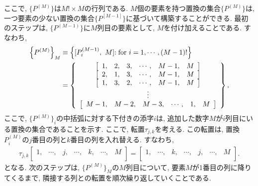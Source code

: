 ここで, $\{P^{(M)}\}$は$M! \times M$の行列である. 
$M$個の要素を持つ置換の集合$\{P^{(M)}\}$は, 一つ要素の少ない置換の集合$\{P^{[M-1]}\}$に基づいて構築することができる. 
最初のステップは, $\{P^{(M-1)}\}$に$M$列目の要素として, $M$を付け加えることである. 
すなわち, 
\begin{align}
	\left\{P^{(M)}\right\}_{M} &\equiv
	\left\{[P_{i}^{(M-1)},~ M] \mathrm{ : for }~ i = 1, \cdots, (M-1)! \right\}
 	\notag
	\\
	&=
 	\left\{
	\begin{array}{c}
  		\left[ \begin{array}{cccccc} 1,   & 2,   & 3,   & \cdots, & M-1, & M \\ \end{array} \right]  \\
  		\left[ \begin{array}{cccccc} 2,   & 1,   & 3,   & \cdots, & M-1, & M \\ \end{array} \right]  \\
  		\left[ \begin{array}{cccccc} 1,   & 3,   & 2,   & \cdots, & M-1, & M \\ \end{array} \right]  \\
  		\vdots \\
  		\left[ \begin{array}{cccccc} M-1, & M-2, & M-3, & \cdots, & 1,   & M \\ \end{array} \right]
 	\end{array}
 \right\} ,
\end{align}
ここで, $\{P^{(M)}\}_{i}$の中括弧に対する下付きの添字$i$は, 追加した数字$M$が$i$列目にいる置換の集合であることを示す. 
ここで, 転置$\tau_{j, k}$を考える. 
この転置は, 置換$P_{i}^{(M)}$の$j$番目の列と$k$番目の列を入れ替える. 
すなわち, 
\begin{align}
  \tau_{j, k}
  \left[
        \begin{array}{ccccccc}
         1, & \cdots, & j, & \cdots, & k, & \cdots, & M \\
        \end{array}
  \right]
  =
  \left[
        \begin{array}{ccccccc}
         1, & \cdots, & k, & \cdots, & j, & \cdots, & M \\
        \end{array}
  \right].
\end{align}
となる. 
次のステップは, $\{P^{(M)}\}_{M}$の$M$列目について, 要素$M$が1番目の列に降りてくるまで, 隣接する列との転置を順次繰り返していくことである. 
